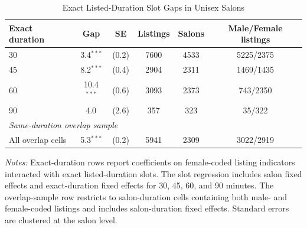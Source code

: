 \begin{table}[htbp]
  \centering
  \caption{Exact Listed-Duration Slot Gaps in Unisex Salons}
  \label{tab:duration_slot_gaps}
  \small
\begin{tabular}{lccccc}
\hline
Exact duration & Gap & SE & Listings & Salons & Male/Female listings \\
\hline
30 & 3.4$^{***}$ & (0.2) & 7600 & 4533 & 5225/2375 \\
45 & 8.2$^{***}$ & (0.4) & 2904 & 2311 & 1469/1435 \\
60 & 10.4$^{***}$ & (0.6) & 3093 & 2373 & 743/2350 \\
90 & 4.0$^{}$ & (2.6) & 357 & 323 & 35/322 \\
\hline
\multicolumn{6}{l}{\textit{Same-duration overlap sample}} \\
All overlap cells & 5.3$^{***}$ & (0.2) & 5941 & 2309 & 3022/2919 \\
\hline
\end{tabular}

\begin{minipage}{0.94\linewidth}
\footnotesize
\textit{Notes:} Exact-duration rows report coefficients on female-coded listing indicators interacted with exact listed-duration slots.
The slot regression includes salon fixed effects and exact-duration fixed effects for 30, 45, 60, and 90 minutes.
The overlap-sample row restricts to salon-duration cells containing both male- and female-coded listings and includes salon-duration fixed effects.
Standard errors are clustered at the salon level.
\end{minipage}
\end{table}
